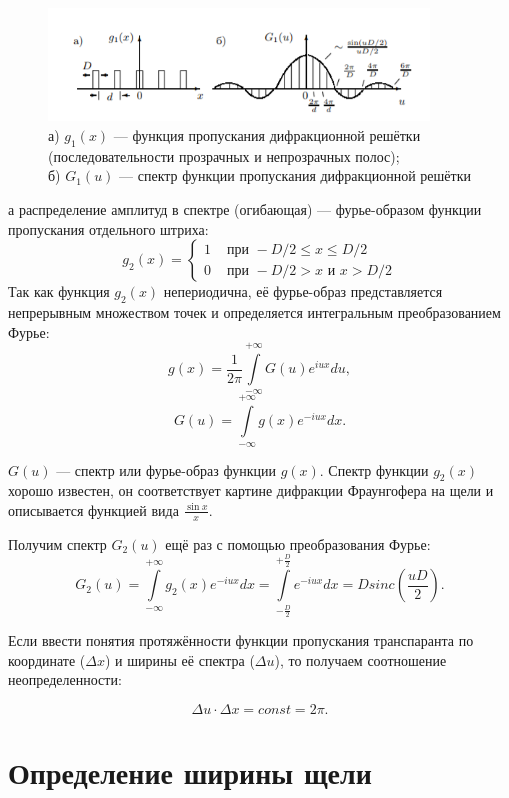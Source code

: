 \documentclass[a4paper, 14pt]{extarticle}%
\newcommand\ECaption[1]{%
     \captionsetup{font=footnotesize}%
     \caption{#1}}
\begin{document}
\begin{figure}[h!]
\begin{center}
\includegraphics[width=0.9\textwidth]{teor1}
\end{center}
\ECaption{а) $g_1(x)$ — функция пропускания дифракционной решётки (последовательности прозрачных и непрозрачных полос);\\
б) $G_1(u)$ — спектр функции пропускания дифракционной решётки}
\end{figure}
а распределение амплитуд в
спектре (огибающая) — фурье-образом функции пропускания отдельного штриха:
\begin{equation}
g_2(x) = 
 \begin{cases}
   1 &\text{ при } -D/2\leq x \leq D/2\\
   0 &\text{ при } -D/2 > x \text{ и } x > D/2
 \end{cases}
\end{equation}
 Так
как функция
$g_2(x)$ непериодична, её фурье-образ представляется
непрерывным множеством точек
и определяется интегральным преобразованием Фурье:
\[g(x) = \frac{1}{2\pi}\int\limits_{-\infty}^{+\infty}G(u)e^{iux}du,\]
\[G(u) = \int\limits_{-\infty}^{+\infty}g(x)e^{-iux}dx.\]

 $G(u)$ — спектр или фурье-образ функции
$g(x)$.
Спектр функции
$g_2(x)$ хорошо известен, он соответствует
картине
дифракции Фраунгофера на щели
и описывается функцией вида $ \frac{\sin x}{x} $.

Получим спектр
$G_2(u)$ ещё раз с помощью преобразования Фурье:
\[G_2(u) = \int\limits_{-\infty}^{+\infty}g_2(x)e^{-iux}dx = \int\limits_{-\frac{D}{2}}^{+\frac{D}{2}}e^{-iux}dx = D sinc(\frac{uD}{2}).\]

Если ввести
понятия протяжённости функции пропускания транспаранта по
координате ($\Delta x$) и ширины её спектра ($ \Delta u $), то получаем соотношение неопределенности:

\[\Delta u \cdot \Delta x = const =2\pi.\]

\section*{Определение ширины щели}
\end{document}
